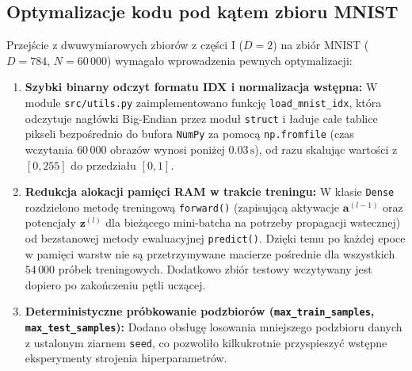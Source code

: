 \documentclass{article}
\begin{document}
\subsection{Optymalizacje kodu pod kątem zbioru MNIST}
Przejście z dwuwymiarowych zbiorów z części I ($D = 2$) na zbiór MNIST ($D = 784$, $N = 60\,000$) wymagało wprowadzenia pewnych optymalizacji:
\begin{enumerate}
    \item \textbf{Szybki binarny odczyt formatu IDX i normalizacja wstępna:} W module \texttt{src/utils.py} zaimplementowano funkcję \texttt{load\_mnist\_idx}, która odczytuje nagłówki Big-Endian przez moduł \texttt{struct} i ładuje całe tablice pikseli bezpośrednio do bufora \texttt{NumPy} za pomocą \texttt{np.fromfile} (czas wczytania $60\,000$ obrazów wynosi poniżej $0.03\,\text{s}$), od razu skalując wartości z $[0, 255]$ do przedziału $[0, 1]$.
    \item \textbf{Redukcja alokacji pamięci RAM w trakcie treningu:} W klasie \texttt{Dense} rozdzielono metodę treningową \texttt{forward()} (zapisującą aktywacje $\mathbf{a}^{(l-1)}$ oraz potencjały $\mathbf{z}^{(l)}$ dla bieżącego mini-batcha na potrzeby propagacji wstecznej) od bezstanowej metody ewaluacyjnej \texttt{predict()}. Dzięki temu po każdej epoce w pamięci warstw nie są przetrzymywane macierze pośrednie dla wszystkich $54\,000$ próbek treningowych. Dodatkowo zbiór testowy wczytywany jest dopiero po zakończeniu pętli uczącej.
    \item \textbf{Deterministyczne próbkowanie podzbiorów (\texttt{max\_train\_samples}, \texttt{max\_test\_samples}):} Dodano obsługę losowania mniejszego podzbioru danych z ustalonym ziarnem \texttt{seed}, co pozwoliło kilkukrotnie przyspieszyć wstępne eksperymenty strojenia hiperparametrów.
\end{enumerate}

\end{document}

